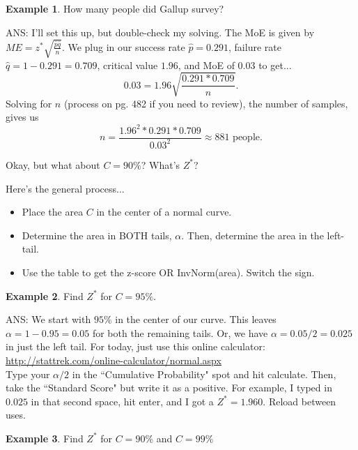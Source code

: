 \documentclass[12pt]{amsart}
\theoremstyle{definition}
\newtheorem{ex}{Example}
\begin{document}
 \begin{ex} How many people did Gallup survey?\end{ex}
 
ANS: I'll set this up, but double-check my solving. The MoE is given by $ME=z^*\sqrt{\frac{\hat{p}\hat{q}}{n}}$. We plug in our success rate $\hat{p}=0.291$, failure rate $\hat{q}=1-0.291=0.709$, critical value $1.96$, and MoE of $0.03$ to get...$$0.03=1.96 \sqrt{\frac{0.291*0.709}{n}}.$$ Solving for $n$ (process on pg. 482 if you need to review), the number of samples, gives us $$n=\frac{1.96^2*0.291*0.709}{0.03^2}\approx 881 \text{ people}.$$

\newpage
\noindent Okay, but what about $C=90\%$? What's $Z^*$?
\begin{framed} Here's the general process...
\begin{itemize}
	\item Place the area $C$ in the center of a normal curve.
	\item Determine the area in BOTH tails, $\alpha$. Then, determine the area in the left-tail.
	\item Use the table to get the z-score OR InvNorm(area). Switch the sign.
\end{itemize}\end{framed}

\begin{ex} Find $Z^*$ for $C=95\%$.\end{ex}

ANS: We start with $95\%$ in the center of our curve. This leaves $\alpha=1-0.95=0.05$ for both the remaining tails. Or, we have $\alpha=0.05/2=0.025$ in just the left tail. For today, just use this online calculator:\\
\url{http://stattrek.com/online-calculator/normal.aspx}\\
Type your $\alpha/2$ in the ``Cumulative Probability" spot and hit calculate. Then, take the ``Standard Score" but write it as a positive. For example, I typed in $0.025$ in that second space, hit enter, and I got a $Z^*=1.960$. Reload between uses.

\begin{ex} Find $Z^*$ for $C=90\%$ and $C=99\%$ \end{ex}
\end{document}
